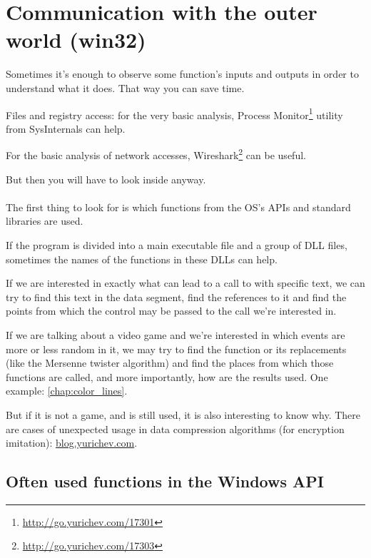 \section{Communication with the outer world (win32)}

Sometimes it's enough to observe some function's inputs and outputs in order to understand what it does.
That way you can save time.

Files and registry access: 
for the very basic analysis, Process Monitor\footnote{\url{http://go.yurichev.com/17301}}
utility from SysInternals can help.

For the basic analysis of network accesses, Wireshark\footnote{\url{http://go.yurichev.com/17303}} can be useful.

But then you will have to look inside anyway. \\
\\
The first thing to look for is which functions from the \ac{OS}'s \ac{API}s and standard libraries are used.

If the program is divided into a main executable file and a group of DLL files, sometimes the names of the functions in these DLLs can help.

If we are interested in exactly what can lead to a call to  with specific text, 
we can try to find this text in the data segment, find the references to it and find the points
from which the control may be passed to the  call we're interested in.

If we are talking about a video game and we're interested in which events are more or less random in it,
we may try to find the \rand function or its replacements (like the Mersenne twister algorithm) and find the places
from which those functions are called, and more importantly, how are the results used.
One example: \ref{chap:color_lines}. 

But if it is not a game, and \rand is still used, it is also interesting to know why.
There are cases of unexpected \rand usage in data compression algorithms (for encryption imitation):
\href{http://go.yurichev.com/17221}{blog.yurichev.com}.

\subsection{Often used functions in the Windows API}

